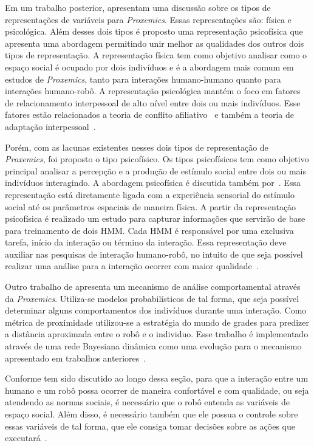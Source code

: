 Em um trabalho posterior,  apresentam uma discussão sobre os tipos de representações de variáveis para \emph{Proxemics}. Essas representações são: física e psicológica. Além desses dois tipos é proposto uma representação psicofísica que apresenta uma abordagem permitindo unir melhor as qualidades dos outros dois tipos de representação. A representação física tem como objetivo analisar como o espaço social é ocupado por dois indivíduos e é a abordagem mais comum em estudos de \emph{Proxemics}, tanto para interações humano-humano quanto para interações humano-robô. A representação psicológica mantém o foco em fatores de relacionamento interpessoal de alto nível entre dois ou mais indivíduos. Esse fatores estão relacionados a teoria de conflito afiliativo~\cite{argyle:1965} e também a teoria de adaptação interpessoal~\cite{burgoon:2007}.

Porém, com as lacunas existentes nesses dois tipos de representação de \emph{Proxemics}, foi proposto o tipo psicofísico. Os tipos psicofísicos tem como objetivo principal analisar a percepção e a produção de estímulo social entre dois ou mais indivíduos interagindo. A abordagem psicofísica é discutida também por~. Essa representação está diretamente ligada com a experiência sensorial do estímulo social até os parâmetros espaciais de maneira física. A partir da representação psicofísica é realizado um estudo para capturar informações que servirão de base para treinamento de dois HMM. Cada HMM é responsável por uma exclusiva tarefa, início da interação ou término da interação. Essa representação deve auxiliar nas pesquisas de interação humano-robô, no intuito de que seja possível realizar uma análise para a interação ocorrer com maior qualidade~\cite{mead:2012}.

Outro trabalho de  apresenta um mecanismo de análise comportamental através da \emph{Proxemics}. Utiliza-se modelos probabilísticos de tal forma, que seja possível determinar alguns comportamentos dos indivíduos durante uma interação. Como métrica de proximidade utilizou-se a estratégia do mundo de grades para predizer a distância aproximada entre o robô e o individuo. Esse trabalho é implementado através de uma rede Bayesiana dinâmica como uma evolução para o mecanismo apresentado em trabalhos anteriores~\cite{mead:2012b}.

Conforme tem sido discutido ao longo dessa seção, para que a interação entre um humano e um robô possa ocorrer de maneira confortável e com qualidade, ou seja atendendo as normas sociais, é necessário que o robô entenda as variáveis de espaço social. Além disso, é necessário também que ele possua o controle sobre essas variáveis de tal forma, que ele consiga tomar decisões sobre as ações que executará~\cite{mead:2013b}.

